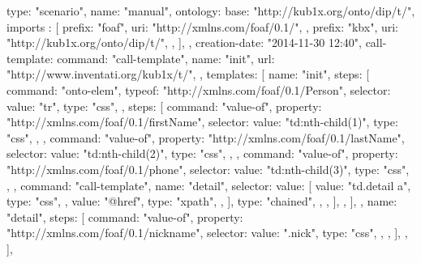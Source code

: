 \begtt
{
  type: "scenario", 
  name: "manual", 
  ontology: {
    base: "http://kub1x.org/onto/dip/t/", 
    imports : [
      {
        prefix: "foaf", 
        uri: "http://xmlns.com/foaf/0.1/", 
      }, 
      {
        prefix: "kbx", 
        uri: "http://kub1x.org/onto/dip/t/", 
      }, 
    ], 
  }, 
  creation-date: "2014-11-30 12:40", 
  call-template: {
    command: "call-template", 
    name: "init", 
    url: "http://www.inventati.org/kub1x/t/", 
  }, 
  templates: [
    {
      name: "init", 
      steps: [
        {
          command: "onto-elem", 
          typeof: "http://xmlns.com/foaf/0.1/Person", 
          selector: {
            value: "tr", 
            type: "css", 
          }, 
          steps: [
            {
              command: "value-of", 
              property: "http://xmlns.com/foaf/0.1/firstName", 
              selector: {
                value: "td:nth-child(1)", 
                type: "css", 
              }, 
            }, 
            {
              command: "value-of", 
              property: "http://xmlns.com/foaf/0.1/lastName", 
              selector: {
                value: "td:nth-child(2)", 
                type:  "css", 
              }, 
            }, 
            {
              command: "value-of", 
              property: "http://xmlns.com/foaf/0.1/phone", 
              selector: {
                value: "td:nth-child(3)", 
                type:  "css", 
              }, 
            },
            {
              command: "call-template", 
              name: "detail", 
              selector: {
                value: [
                  {
                    value: "td.detail a", 
                    type:  "css", 
                  }, 
                  {
                    value: "@href", 
                    type: "xpath", 
                  }, 
                ], 
                type: "chained", 
              }, 
            }, 
          ], 
        }, 
      ], 
    }, 
    {
      name: "detail", 
      steps: [
        {
          command: "value-of", 
          property: "http://xmlns.com/foaf/0.1/nickname", 
          selector: {
            value: ".nick", 
            type:  "css", 
          }, 
        },
      ], 
    }, 
  ], 
}
\endtt

